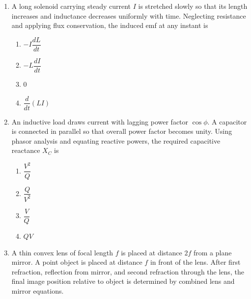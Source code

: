 \documentclass[12pt]{article}
\begin{document}
\begin{enumerate}[leftmargin=*]
\begin{enumerate}
\item $\epsilon$
\item $-\epsilon$
\item $\dfrac{\epsilon}{2}$
\item $0$
\end{enumerate}

\item A long solenoid carrying steady current $I$ is stretched slowly so that its length increases and inductance decreases uniformly with time. Neglecting resistance and applying flux conservation, the induced emf at any instant is

\begin{center}
\end{center}

\begin{enumerate}
\item $-I\dfrac{dL}{dt}$
\item $-L\dfrac{dI}{dt}$
\item $0$
\item $\dfrac{d}{dt}(LI)$
\end{enumerate}

\item An inductive load draws current with lagging power factor $\cos\phi$. A capacitor is connected in parallel so that overall power factor becomes unity. Using phasor analysis and equating reactive powers, the required capacitive reactance $X_C$ is

\begin{enumerate}
\item $\dfrac{V^2}{Q}$
\item $\dfrac{Q}{V^2}$
\item $\dfrac{V}{Q}$
\item $QV$
\end{enumerate}

\item A thin convex lens of focal length $f$ is placed at distance $2f$ from a plane mirror. A point object is placed at distance $f$ in front of the lens. After first refraction, reflection from mirror, and second refraction through the lens, the final image position relative to object is determined by combined lens and mirror equations.


\end{enumerate}
\end{document}
